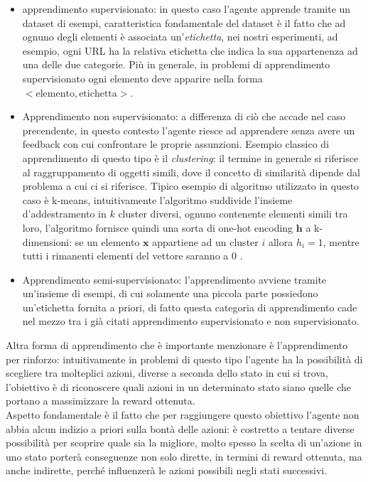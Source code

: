 \documentclass[../../main.tex]{subfiles}
\begin{document}
    \begin{itemize}
        \item apprendimento supervisionato: in questo caso l'agente apprende tramite un dataset di esempi, caratteristica fondamentale del dataset è il fatto che ad ognuno degli elementi è associata un'\textit{etichetta}, nei nostri esperimenti, ad esempio, ogni URL ha la relativa etichetta che indica la sua appartenenza ad  una delle due categorie. Più in generale, in problemi di apprendimento supervisionato ogni elemento deve apparire nella forma $ <\text{elemento}, \text{etichetta}> $.
        \item Apprendimento non supervisionato: a differenza di ciò che accade nel caso precendente, in questo contesto l'agente riesce ad apprendere senza avere un feedback con cui confrontare le proprie assunzioni. Esempio classico di apprendimento di questo tipo è il \textit{clustering}: il termine in generale si riferisce al raggruppamento di oggetti simili, dove il concetto di similarità dipende dal problema a cui ci si riferisce. Tipico esempio di algoritmo utilizzato in questo caso è k-means, intuitivamente l'algoritmo suddivide  l'insieme d'addestramento in $k$ cluster diversi, ognuno contenente elementi simili tra loro, l'algoritmo fornisce quindi una sorta di one-hot encoding $\boldsymbol{h}$ a k-dimensioni: se un elemento $\boldsymbol{x}$ appartiene ad un cluster $i$ allora $h_i = 1$, mentre tutti i rimanenti elementi del vettore saranno a 0 \cite{goodfellow2016deep}.
        \item Apprendimento semi-supervisionato: l'apprendimento avviene tramite un'insieme di esempi, di cui solamente una piccola parte possiedono un'etichetta fornita a priori, di fatto questa categoria di apprendimento cade nel mezzo tra i già citati apprendimento supervisionato e non supervisionato.
    \end{itemize}

    Altra forma di apprendimento che è importante menzionare è l'apprendimento per rinforzo: intuitivamente in problemi di questo tipo l'agente ha la possibilità di scegliere tra molteplici azioni, diverse a seconda dello stato in cui si trova, l'obiettivo è di riconoscere quali azioni in un determinato stato siano quelle che portano a massimizzare la reward ottenuta.\\
    Aspetto fondamentale è il fatto che per raggiungere questo obiettivo l'agente non abbia alcun indizio a priori sulla bontà delle azioni: è costretto a tentare diverse possibilità per scoprire quale sia la migliore, molto spesso la scelta di un'azione in uno stato porterà conseguenze non solo dirette, in termini di reward ottenuta, ma anche indirette, perché influenzerà le azioni possibili negli stati successivi.
\end{document}
